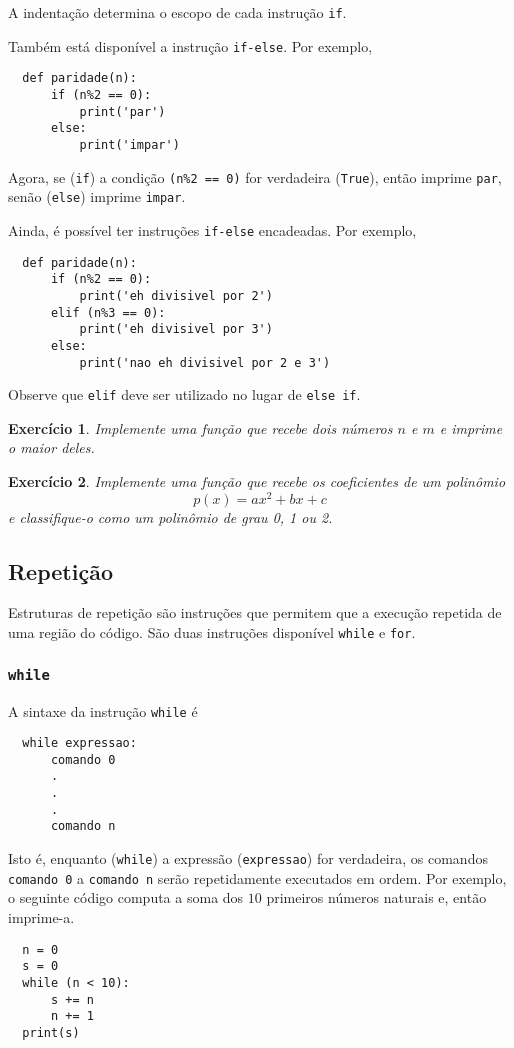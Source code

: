 \documentclass[12pt]{article}
\newtheorem{exr}{Exercício}[section]
\begin{document}
\begin{obs}
  A indentação determina o escopo de cada instrução \lstinline+if+.
\end{obs}

Também está disponível a instrução \lstinline+if-else+. Por exemplo,
\begin{lstlisting}
  def paridade(n):
      if (n%2 == 0):
          print('par')
      else:
          print('impar')    
\end{lstlisting}
Agora, se (\lstinline+if+) a condição \lstinline!(n%2 == 0)! for verdadeira (\lstinline+True+), então imprime \lstinline+par+, senão (\lstinline+else+) imprime \lstinline+impar+.

Ainda, é possível ter instruções \lstinline+if-else+ encadeadas. Por exemplo,
\begin{lstlisting}
  def paridade(n):
      if (n%2 == 0):
          print('eh divisivel por 2')
      elif (n%3 == 0):
          print('eh divisivel por 3')
      else:
          print('nao eh divisivel por 2 e 3')    
\end{lstlisting}
Observe que \lstinline+elif+ deve ser utilizado no lugar de \lstinline+else if+.

\begin{exr}
  Implemente uma função que recebe dois números $n$ e $m$ e imprime o maior deles.
\end{exr}

\begin{exr}
  Implemente uma função que recebe os coeficientes de um polinômio
  \begin{equation}
    p(x) = ax^2 + bx + c
  \end{equation}
  e classifique-o como um polinômio de grau 0, 1 ou 2.
\end{exr}

\subsection{Repetição}

Estruturas de repetição são instruções que permitem que a execução repetida de uma região do código. São duas instruções disponível \lstinline+while+ e \lstinline+for+.

\subsubsection{\lstinline+while+}

A sintaxe da instrução \lstinline+while+ é
\begin{lstlisting}
  while expressao:
      comando 0
      .
      .
      .
      comando n
\end{lstlisting}
Isto é, enquanto (\lstinline+while+) a expressão (\lstinline+expressao+) for verdadeira, os comandos \lstinline+comando 0+ a \lstinline+comando n+ serão repetidamente executados em ordem. Por exemplo, o seguinte código computa a soma dos $10$ primeiros números naturais e, então imprime-a.
\begin{lstlisting}
  n = 0
  s = 0
  while (n < 10):
      s += n
      n += 1
  print(s)
\end{lstlisting}
\end{document}
